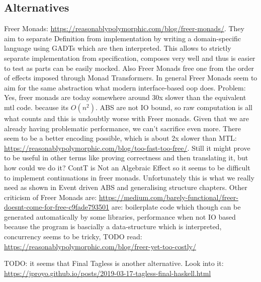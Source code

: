 \subsection{Alternatives}
Freer Monads: \url{https://reasonablypolymorphic.com/blog/freer-monads/}. They aim to separate Definition from implementation by writing a domain-specific language using GADTs which are then interpreted. This allows to strictly separate implementation from specification, composes very well and thus is easier to test as parts can be easily mocked. Also Freer Monads free one from the order of effects imposed through Monad Transformers. In general Freer Monads seem to aim for the same abstraction what modern interface-based oop does.
Problem: Yes, freer monads are today somewhere around 30x slower than the equivalent mtl code. because its $O(n^2)$. ABS are not IO bound, so raw computation is all what counts and this is undoubtly worse with Freer monads. Given that we are already having problematic performance, we can't sacrifice even more. There seem to be a better encoding possible, which is about 2x slower than MTL: \url{https://reasonablypolymorphic.com/blog/too-fast-too-free/}. Still it might prove to be useful in other terms like proving correctness and then translating it, but how could we do it?  
ContT is Not an Algebraic Effect so it seems to be difficult to implement continuations in freer monads. Unfortunately this is what we really need as shown in Event driven ABS and generalising structure chapters.
Other criticism of Freer Monads are: \url{https://medium.com/barely-functional/freer-doesnt-come-for-free-c9fade793501} are: boilerplate code which though can be generated automatically by some libraries, performance when not IO based because the program is bascially a data-structure which is interpreted, concurrency seems to be tricky, 
TODO read: \url{https://reasonablypolymorphic.com/blog/freer-yet-too-costly/}

TODO: it seems that Final Tagless is another alternative. Look into it: \url{https://jproyo.github.io/posts/2019-03-17-tagless-final-haskell.html}



